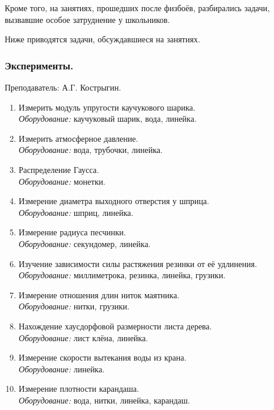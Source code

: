 \documentclass[12pt,a4paper,oneside]{scrartcl}
\begin{document}
Кроме того, на занятиях, прошедших после физбоёв, разбирались задачи,
вызвавшие особое затруднение у школьников. 

Ниже приводятся задачи, обсуждавшиеся на занятиях. 

\clearpage









\subsubsection{Эксперименты.}
\label{sec:daily_10_exp}

\textsf{Преподаватель: А.Г. Кострыгин.}

\begin{enumerate}
\item Измерить модуль упругости каучукового шарика. \\
  \textit{Оборудование:} каучуковый шарик, вода, линейка.
\item Измерить атмосферное давление. \\ \textit{Оборудование:} вода, трубочки, линейка.
\item Распределение Гаусса. \\ \textit{Оборудование:} монетки.
\item Измерение диаметра выходного отверстия у шприца. \\
  \textit{Оборудование:} шприц, линейка.
\item Измерение радиуса песчинки. \\ \textit{Оборудование:}
  секундомер, линейка.
\item Изучение зависимости силы растяжения резинки от её удлинения. \\
  \textit{Оборудование:} миллиметрока, резинка, линейка, грузики.
\item Измерение отношения длин ниток маятника. \\ \textit{Оборудование:} нитки,
  грузики.
\item Нахождение хаусдорфовой размерности листа дерева. \\
  \textit{Оборудование:} лист клёна, линейка.
\item Измерение скорости вытекания воды из крана. \\
  \textit{Оборудование:} линейка.
\item Измерение плотности карандаша. \\ \textit{Оборудование:} вода,
  нитки, линейка, карандаш. 
\end{enumerate}
\end{document}
